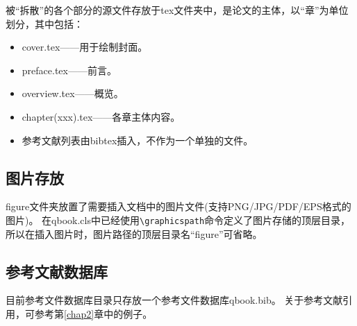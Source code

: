 被“拆散”的各个部分的源文件存放于tex文件夹中，是论文的主体，以“章”为单位划分，其中包括：

\begin{itemize}[noitemsep,topsep=0pt,parsep=0pt,partopsep=0pt]
	\item cover.tex——用于绘制封面。
	\item preface.tex——前言。
	\item overview.tex——概览。
	\item chapter(xxx).tex——各章主体内容。
	\item 参考文献列表由bibtex插入，不作为一个单独的文件。
\end{itemize}

\subsection{图片存放}

figure文件夹放置了需要插入文档中的图片文件(支持PNG/JPG/PDF/EPS格式的图片)。
在qbook.cls中已经使用\verb|\graphicspath|命令定义了图片存储的顶层目录，所以在插入图片时，图片路径的顶层目录名“figure”可省略。

\subsection{参考文献数据库}

目前参考文件数据库目录只存放一个参考文件数据库qbook.bib。
关于参考文献引用，可参考第\ref{chap2}章中的例子。
